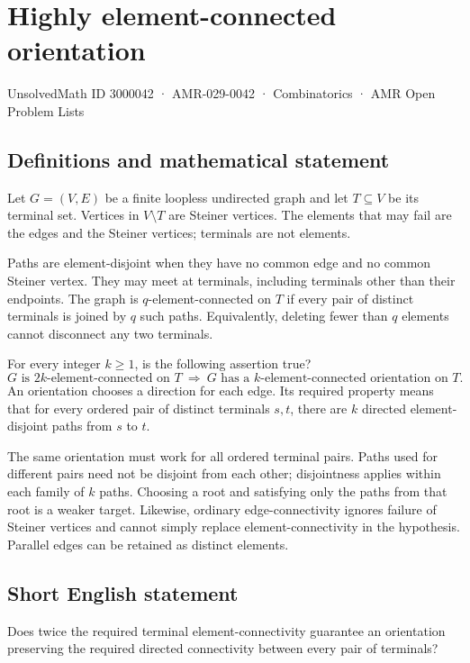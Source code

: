 \documentclass[11pt,a4paper]{article}
\begin{document}
\section*{Highly element-connected orientation}\label{3000042}
{\small UnsolvedMath ID 3000042 · AMR-029-0042 · Combinatorics · AMR Open Problem Lists}
\subsection{Definitions and mathematical statement}
Let $G=(V,E)$ be a finite loopless undirected graph and let
$T\subseteq V$ be its terminal set. Vertices in $V\setminus T$ are
Steiner vertices. The elements that may fail are the edges and the
Steiner vertices; terminals are not elements.

Paths are element-disjoint when they have no common edge and no
common Steiner vertex. They may meet at terminals, including terminals
other than their endpoints. The graph is $q$-element-connected on $T$
if every pair of distinct terminals is joined by $q$ such paths.
Equivalently, deleting fewer than $q$ elements cannot disconnect any
two terminals.

For every integer $k\ge1$, is the following assertion true?
\[
 G\text{ is }2k\text{-element-connected on }T
 \ \Longrightarrow\
 G\text{ has a }k\text{-element-connected orientation on }T.
\]
An orientation chooses a direction for each edge. Its required property
means that for every ordered pair of distinct terminals $s,t$, there
are $k$ directed element-disjoint paths from $s$ to $t$.

The same orientation must work for all ordered terminal pairs.
Paths used for different pairs need not be disjoint from each other;
disjointness applies within each family of $k$ paths. Choosing a root
and satisfying only the paths from that root is a weaker target.
Likewise, ordinary edge-connectivity ignores failure of Steiner vertices
and cannot simply replace element-connectivity in the hypothesis.
Parallel edges can be retained as distinct elements.
\subsection{Short English statement}
Does twice the required terminal element-connectivity guarantee an orientation preserving the required directed connectivity between every pair of terminals?
\end{document}
